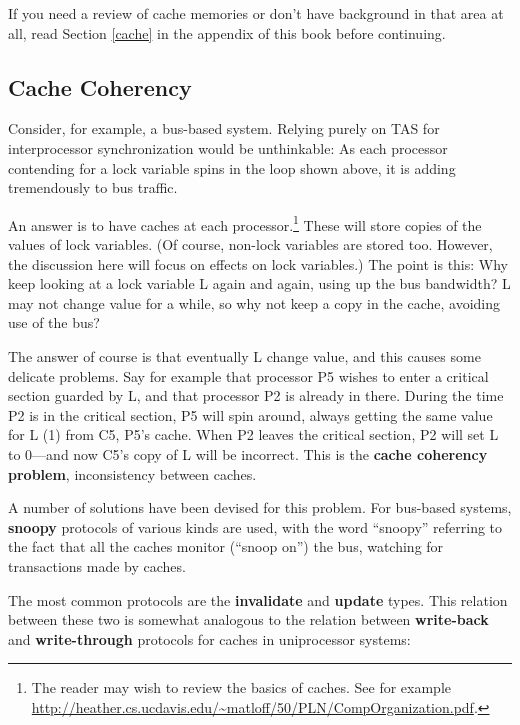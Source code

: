 If you need a review of cache memories or don't have background in that
area at all, read Section \ref{cache} in the appendix of this book
before continuing.

\subsection{Cache Coherency}
\label{cachecoherency}

Consider, for example, a bus-based system. Relying purely on TAS for
interprocessor synchronization would be unthinkable: As each processor
contending for a lock variable spins in the loop shown above, it is
adding tremendously to bus traffic.

An answer is to have caches at each processor.\footnote{The reader may
wish to review the basics of caches.  See for example
\url{http://heather.cs.ucdavis.edu/~matloff/50/PLN/CompOrganization.pdf}.}
These will store copies of the values of lock variables.  (Of course,
non-lock variables are stored too.  However, the discussion here will
focus on effects on lock variables.) The point is this: Why keep looking
at a lock variable L again and again, using up the bus bandwidth? L may
not change value for a while, so why not keep a copy in the cache,
avoiding use of the bus?

The answer of course is that eventually L  change value,
and this causes some delicate problems. Say for example that processor
P5 wishes to enter a critical section guarded by L, and that processor
P2 is already in there. During the time P2 is in the critical section,
P5 will spin around, always getting the same value for L (1) from C5,
P5's cache. When P2 leaves the critical section, P2 will set L to
0---and now C5's copy of L will be incorrect. This is the \textbf{cache
coherency problem}, inconsistency between caches.

A number of solutions have been devised for this problem. For bus-based
systems, \textbf{snoopy} protocols of various kinds are used, with the
word ``snoopy'' referring to the fact that all the caches monitor
(``snoop on'') the bus, watching for transactions made by
 caches.

The most common protocols are the \textbf{invalidate} and
\textbf{update} types.  This relation between these two is somewhat
analogous to the relation between \textbf{write-back} and
\textbf{write-through} protocols for caches in uniprocessor systems:

